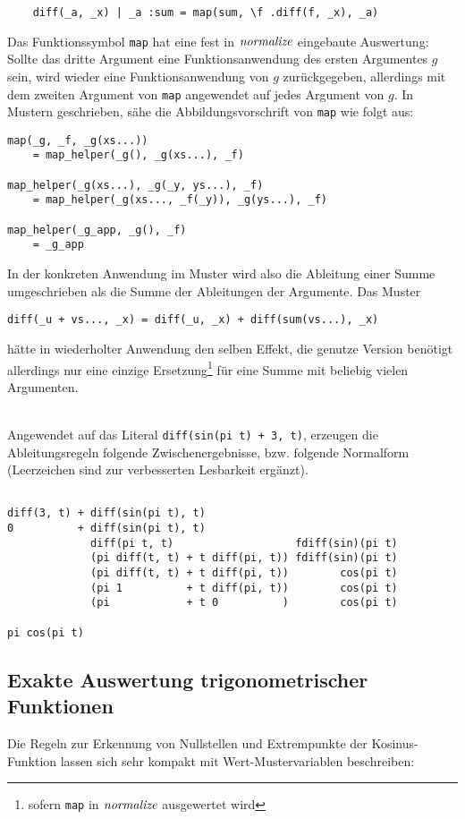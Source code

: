 \verb~    diff(_a, _x) | _a :sum = map(sum, \f .diff(f, _x), _a)~

Das Funktionssymbol \verb|map| hat eine fest in $\mathit{normalize}$ eingebaute Auswertung: Sollte das dritte Argument eine Funktionsanwendung des ersten Argumentes $g$ sein, wird wieder eine Funktionsanwendung von $g$ zurückgegeben, allerdings mit dem zweiten Argument von \verb|map| angewendet auf jedes Argument von $g$. In Mustern geschrieben, sähe die Abbildungsvorschrift von \verb|map| wie folgt aus:

\begin{verbatim}
map(_g, _f, _g(xs...)) 
    = map_helper(_g(), _g(xs...), _f)

map_helper(_g(xs...), _g(_y, ys...), _f) 
    = map_helper(_g(xs..., _f(_y)), _g(ys...), _f)

map_helper(_g_app, _g(), _f) 
    = _g_app
\end{verbatim}

In der konkreten Anwendung im Muster wird also die Ableitung einer Summe umgeschrieben als die Summe der Ableitungen der Argumente. Das Muster

\verb|diff(_u + vs..., _x) = diff(_u, _x) + diff(sum(vs...), _x)|

hätte in wiederholter Anwendung den selben Effekt, die genutze Version benötigt allerdings nur eine einzige Ersetzung\footnote{sofern \texttt{map} in $\mathit{normalize}$ ausgewertet wird} für eine Summe mit beliebig vielen Argumenten.

\begin{beispiel}~\\
Angewendet auf das Literal \verb|diff(sin(pi t) + 3, t)|, erzeugen die Ableitungsregeln folgende Zwischenergebnisse, bzw. folgende Normalform (Leerzeichen sind zur verbesserten Lesbarkeit ergänzt).
\begin{verbatim}

diff(3, t) + diff(sin(pi t), t)
0          + diff(sin(pi t), t)
             diff(pi t, t)                   fdiff(sin)(pi t)
             (pi diff(t, t) + t diff(pi, t)) fdiff(sin)(pi t)
             (pi diff(t, t) + t diff(pi, t))        cos(pi t)
             (pi 1          + t diff(pi, t))        cos(pi t)
             (pi            + t 0          )        cos(pi t)
             
pi cos(pi t)
\end{verbatim}
\end{beispiel}

\subsection{Exakte Auswertung trigonometrischer Funktionen} \label{subsubsecCos}
Die Regeln zur Erkennung von Nullstellen und Extrempunkte der Kosinus-Funktion lassen sich sehr kompakt mit Wert-Mustervariablen beschreiben: 

